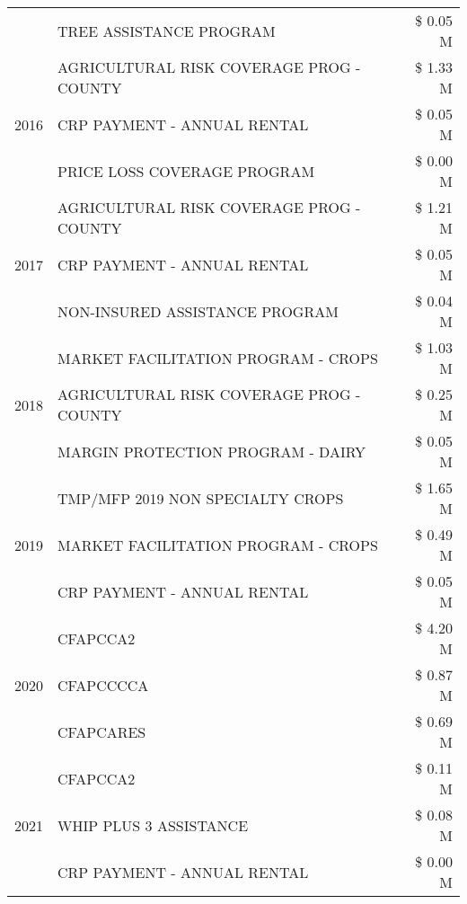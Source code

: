 \begin{tabular}{llr}
 & TREE ASSISTANCE PROGRAM & \$ 0.05 M \\
\cline{1-3}
\multirow[t]{3}{*}{2016} & AGRICULTURAL RISK COVERAGE PROG - COUNTY & \$ 1.33 M \\
 & CRP PAYMENT - ANNUAL RENTAL & \$ 0.05 M \\
 & PRICE LOSS COVERAGE PROGRAM & \$ 0.00 M \\
\cline{1-3}
\multirow[t]{3}{*}{2017} & AGRICULTURAL RISK COVERAGE PROG - COUNTY & \$ 1.21 M \\
 & CRP PAYMENT - ANNUAL RENTAL & \$ 0.05 M \\
 & NON-INSURED ASSISTANCE PROGRAM & \$ 0.04 M \\
\cline{1-3}
\multirow[t]{3}{*}{2018} & MARKET FACILITATION PROGRAM - CROPS & \$ 1.03 M \\
 & AGRICULTURAL RISK COVERAGE PROG - COUNTY & \$ 0.25 M \\
 & MARGIN PROTECTION PROGRAM - DAIRY & \$ 0.05 M \\
\cline{1-3}
\multirow[t]{3}{*}{2019} & TMP/MFP 2019 NON SPECIALTY CROPS & \$ 1.65 M \\
 & MARKET FACILITATION PROGRAM - CROPS & \$ 0.49 M \\
 & CRP PAYMENT - ANNUAL RENTAL & \$ 0.05 M \\
\cline{1-3}
\multirow[t]{3}{*}{2020} & CFAPCCA2 & \$ 4.20 M \\
 & CFAPCCCCA & \$ 0.87 M \\
 & CFAPCARES & \$ 0.69 M \\
\cline{1-3}
\multirow[t]{3}{*}{2021} & CFAPCCA2 & \$ 0.11 M \\
 & WHIP PLUS 3 ASSISTANCE & \$ 0.08 M \\
 & CRP PAYMENT - ANNUAL RENTAL & \$ 0.00 M \\
\cline{1-3}
\bottomrule
\end{tabular}
